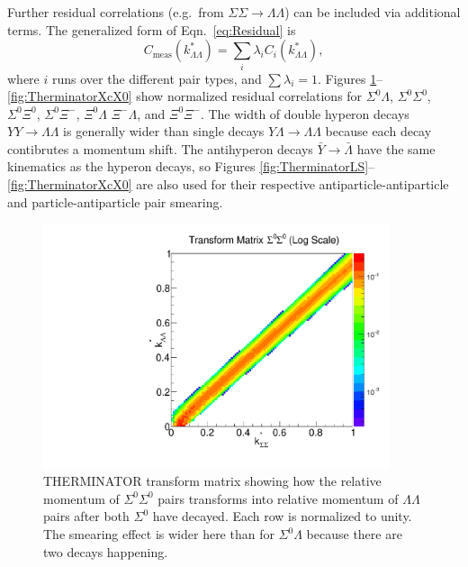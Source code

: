 Further residual correlations (e.g.\ from $\Sigma\Sigma \rightarrow \Lambda\Lambda$) can be included via additional terms.
The generalized form of Eqn.\ \ref{eq:Residual} is 
\begin{equation}
\label{eq:GeneralizedLambda}
C_{\mathrm{meas}}(k^*_{\Lambda\Lambda})= \sum_{i} \lambda_{i} C_{i}(k^*_{\Lambda\Lambda}),
\end{equation}
where $i$ runs over the different pair types, and $\sum \lambda_{i} = 1$.
Figures \ref{fig:TherminatorSS}--\ref{fig:TherminatorXcX0} show normalized residual correlations for $\Sigma^0\Lambda$, $\Sigma^0\Sigma^0$, $\Sigma^0\Xi^{0}$, $\Sigma^0\Xi^{-}$, $\Xi^0\Lambda$ $\Xi^{-}\Lambda$, and $\Xi^0\Xi^{-}$. 
The width of double hyperon decays $YY \rightarrow \Lambda\Lambda$ is generally wider than single decays $Y\Lambda \rightarrow \Lambda\Lambda$ because each decay contibrutes a momentum shift.
The antihyperon decays $\bar{Y} \rightarrow \bar{\Lambda}$ have the same kinematics as the hyperon decays, so Figures \ref{fig:TherminatorLS}--\ref{fig:TherminatorXcX0} are also used for their respective antiparticle-antiparticle and particle-antiparticle pair smearing.

\begin{figure}[hbtp]
\begin{center}
\includegraphics[width=24pc]{Figures/TransformMatrices/2016-7-20-TransformMatrixSigmaSigmaNormLog.pdf}
\end{center}
\caption[Transform matrix for $k^*_{\Sigma^0\Sigma^0} \rightarrow k^*_{\Lambda\Lambda}$]{THERMINATOR \cite{Chojnacki:2011hb} transform matrix showing how the relative momentum of $\Sigma^0\Sigma^0$ pairs transforms into relative momentum of $\Lambda\Lambda$ pairs after both $\Sigma^0$ have decayed. Each row is normalized to unity. The smearing effect is wider here than for $\Sigma^0\Lambda$ because there are two decays happening.}
\label{fig:TherminatorSS}
\end{figure}

